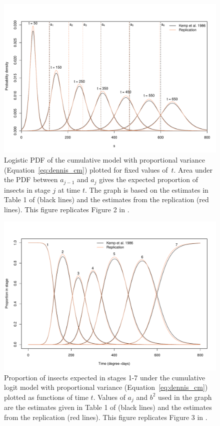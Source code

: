  
\begin{figure}[p]
  \centering
  \includegraphics[width=\textwidth]{../figures/dennis_fig2.pdf}
  \caption{Logistic PDF of the cumulative model with proportional variance (Equation~\ref{eq:dennis_cm}) plotted for fixed values of~$t$. 
  Area under the PDF between $a_{j-1}$ and $a_j$ gives the expected proportion of insects in stage $j$ at time $t$. 
  The graph is based on the estimates in Table 1 of \citep{kemp1986stochastic} (black lines) and the estimates from the replication (red lines). 
  This figure replicates Figure 2 in \citep{dennis1986stochastic}.}
  \label{fig:fig1}
\end{figure}


\begin{figure}[p]
  \centering
  \includegraphics[width=\textwidth]{../figures/dennis_fig3.pdf}
  \caption{Proportion of insects expected in stages 1-7 under the cumulative logit model with proportional variance (Equation~\ref{eq:dennis_cm}) plotted as functions of time $t$.
   Values of $a_j$ and $b^2$ used in the graph are the estimates given in Table 1 of \citep{kemp1986stochastic} (black lines) and the estimates from the replication (red lines). 
   This figure replicates Figure 3 in \citep{dennis1986stochastic}.}
  \label{fig:fig2}
\end{figure} 


